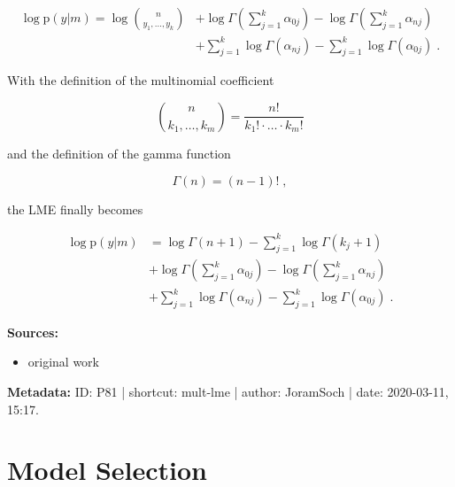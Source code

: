 \documentclass[a4paper,12pt,twoside]{book}
\begin{document}
\begin{equation} \label{eq:mult-lme-Mult-LME-s1}
\begin{split}
\log \mathrm{p}(y|m) = \log {n \choose {y_1, \ldots, y_k}} &+ \log \Gamma \left( \sum_{j=1}^{k} \alpha_{0j} \right) - \log \Gamma \left( \sum_{j=1}^{k} \alpha_{nj} \right) \\
&+ \sum_{j=1}^k \log \Gamma(\alpha_{nj}) - \sum_{j=1}^k \log \Gamma(\alpha_{0j}) \; .
\end{split}
\end{equation}

With the definition of the multinomial coefficient

\begin{equation} \label{eq:mult-lme-mult-coeff}
{n \choose {k_1, \ldots, k_m}} = \frac{n!}{k_1! \cdot \ldots \cdot k_m!}
\end{equation}

and the definition of the gamma function

\begin{equation} \label{eq:mult-lme-gam-fct}
\Gamma(n) = (n-1)! \; ,
\end{equation}

the LME finally becomes

\begin{equation} \label{eq:mult-lme-Mult-LME-s2}
\begin{split}
\log \mathrm{p}(y|m) &= \log \Gamma(n+1) - \sum_{j=1}^{k} \log \Gamma(k_j+1) \\
&+ \log \Gamma \left( \sum_{j=1}^{k} \alpha_{0j} \right) - \log \Gamma \left( \sum_{j=1}^{k} \alpha_{nj} \right) \\
&+ \sum_{j=1}^k \log \Gamma(\alpha_{nj}) - \sum_{j=1}^k \log \Gamma(\alpha_{0j}) \; .
\end{split}
\end{equation}


\vspace{1em}
\textbf{Sources:}
\begin{itemize}
\item original work\end{itemize}


\vspace{1em}
\textbf{Metadata:} ID: P81 | shortcut: mult-lme | author: JoramSoch | date: 2020-03-11, 15:17.
\vspace{1em}





\chapter{Model Selection} \label{sec:Model Selection} \newpage
\end{document}
